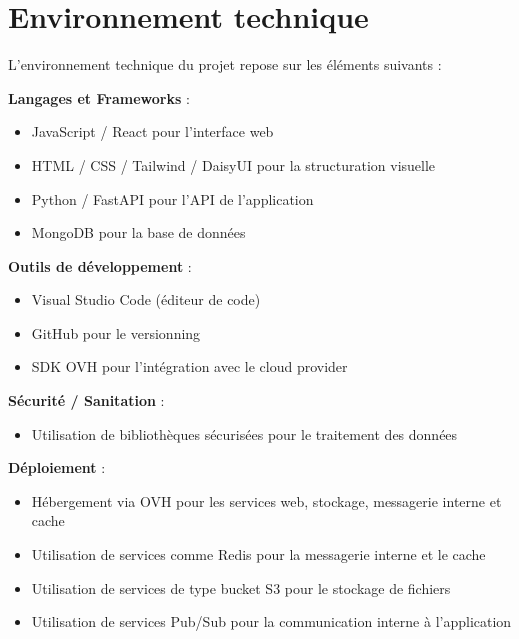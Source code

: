 \section{Environnement technique}

L’environnement technique du projet repose sur les éléments suivants :

\textbf{Langages et Frameworks} :
\begin{itemize}
  \item JavaScript / React pour l’interface web
  \item HTML / CSS / Tailwind / DaisyUI pour la structuration visuelle
  \item Python / FastAPI pour l’API de l’application
  \item MongoDB pour la base de données
\end{itemize}

\textbf{Outils de développement} :
\begin{itemize}
  \item Visual Studio Code (éditeur de code)
  \item GitHub pour le versionning
  \item SDK OVH pour l’intégration avec le cloud provider
\end{itemize}

\textbf{Sécurité / Sanitation} :
\begin{itemize}
  \item Utilisation de bibliothèques sécurisées pour le traitement des données
\end{itemize}

\textbf{Déploiement} :
\begin{itemize}
  \item Hébergement via OVH pour les services web, stockage, messagerie interne et cache
  \item Utilisation de services comme Redis pour la messagerie interne et le cache
  \item Utilisation de services de type bucket S3 pour le stockage de fichiers
  \item Utilisation de services Pub/Sub pour la communication interne à l’application
\end{itemize}
